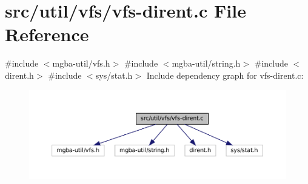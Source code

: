 \hypertarget{vfs-dirent_8c}{}\section{src/util/vfs/vfs-\/dirent.c File Reference}
\label{vfs-dirent_8c}
{\ttfamily \#include $<$mgba-\/util/vfs.\+h$>$}\newline
{\ttfamily \#include $<$mgba-\/util/string.\+h$>$}\newline
{\ttfamily \#include $<$dirent.\+h$>$}\newline
{\ttfamily \#include $<$sys/stat.\+h$>$}\newline
Include dependency graph for vfs-\/dirent.c\+:
\nopagebreak
\begin{figure}[H]
\begin{center}
\leavevmode
\includegraphics[width=350pt]{vfs-dirent_8c__incl}
\end{center}
\end{figure}
